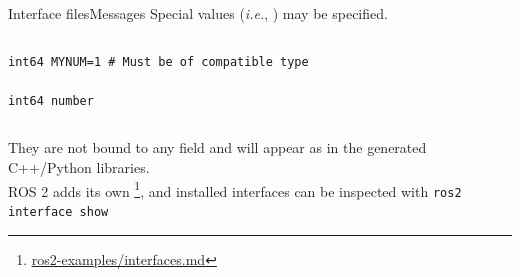 \begin{frame}[fragile]{Interface files}{Messages}
	Special values (\emph{i.e.}, ) may be specified.

	\begin{columns}
		\begin{lstlisting}[language=ros2msg, caption=Definition of an example message with a constant value.]
int64 MYNUM=1 # Must be of compatible type

int64 number\end{lstlisting}
	\end{columns}

	They are not bound to any field and will appear as  in the generated C++/Python libraries.\\
	ROS 2 adds its own \footnote{\href{https://github.com/IntelligentSystemsLabUTV/ros2-examples/blob/humble/interfaces.md}{\color{blue}\underline{ros2-examples/interfaces.md}}}, and installed interfaces can be inspected with
  \newline\newline
	\texttt{ros2 interface show}
\end{frame}

